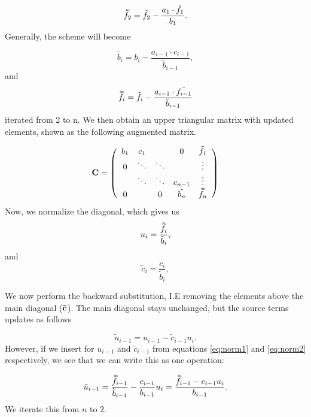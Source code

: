 \documentclass{emulateapj}
\newcommand{\dbtilde}[1]{\accentset{\approx}{#1}}
\begin{document}
\begin{equation}
    \dbtilde{f_2} = \tilde{f_2} - \frac{a_1 \cdot \tilde{f_1}}{b_1}.
\end{equation}
Generally, the scheme will become

\begin{equation} \label{eq:fgen1}
    \tilde{b_i} = b_i - \frac{a_{i-1} \cdot c_{i-1}}{\tilde{b}_{i-1}},
\end{equation}
and
\begin{equation} \label{eq:fgen2}
    \dbtilde{f_{i}} = \tilde{f_{i}} - \frac{a_{i-1} \cdot \tilde{f_{i-1}}}{\tilde{b}_{i-1}}
\end{equation}
iterated from 2 to n. We then obtain an upper triangular matrix with updated elements, shown as the following augmented matrix.

\begin{equation}
    \bold{C} = \left( \begin{array}{ccccc}
b_{1} & c_1 & & 0 & \tilde{f_1} \\
0 & \ddots & \ddots & & \vdots \\
& \ddots & \ddots & c_{n-1} & \vdots \\
0 & & 0 & \tilde{b_{n}} & \dbtilde{f_n} \end{array} \right)
\end{equation}
Now, we normalize the diagonal, which gives us 
\begin{equation} \label{eq:norm1}
    {u}_{i} = \frac{\dbtilde{f}_{i}}{\tilde{b}_i},
\end{equation}
and 
\begin{equation} \label{eq:norm2}
    \tilde{c}_{i} = \frac{{c}_{i}}{\tilde{b}_i},
\end{equation}

We now perform the backward substitution, I.E removing the elements above the main diagonal ($\bold{\tilde{c}}$). The main diagonal stays unchanged, but the source terms updates as follows

\begin{equation}
    \tilde{u}_{i-1} = u_{i-1} - \tilde{c}_{i-1} u_i.
\end{equation}
However, if we insert for $u_{i-1}$ and $\tilde{c}_{i-1}$ from equations \ref{eq:norm1} and \ref{eq:norm2} respectively, we see that we can write this as one operation:

\begin{equation} \label{eq:finalback}
    \tilde{u}_{i-1} = \frac{\dbtilde{f}_{i-1}}{\tilde{b}_{i-1}} - \frac{c_{i-1}}{b_{i-1}} u_i = \frac{\dbtilde{f}_{i-1} -c_{i-1}u_i }{b_{i-1}}.
\end{equation}
We iterate this from $n$ to $2$.
\end{document}
